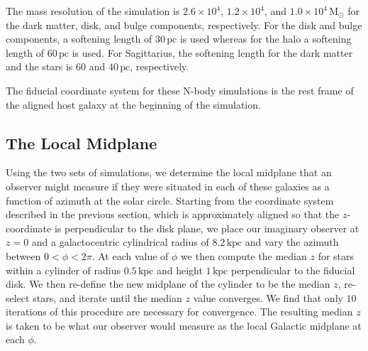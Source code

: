 \documentclass[twocolumn]{aastex62}
\newcommand{\Msun}{\ensuremath{\text{M}_\odot}}
\newcommand{\pc}{\text{pc}}
\newcommand{\kpc}{\text{kpc}}
\begin{document}
The mass resolution of the simulation is $2.6\times10^4$, $1.2\times10^4$, and
$1.0\times10^4\,\Msun$ for the dark matter, disk, and bulge components,
respectively. For the disk and bulge components, a softening length of
$30\,\pc$ is used whereas for the halo a softening length of $60\,\pc$ is
used. For Sagittarius, the softening length for the dark matter and the stars
is $60$ and $40\,\pc$, respectively.

The fiducial coordinate system for these N-body simulations is the rest frame
of the aligned host galaxy at the beginning of the simulation.

\subsection{The Local Midplane} \label{ssec:local_midplane}
Using the two sets of simulations, we determine the local midplane that an
observer might measure if they were situated in each of these galaxies as a
function of azimuth at the solar circle. Starting from the coordinate system
described in the previous section, which is approximately aligned so that the
$z$-coordinate is perpendicular to the disk plane, we place our imaginary
observer at $z=0$ and a galactocentric cylindrical radius of $8.2\,\kpc$ and
vary the azimuth between $0<\phi<2\pi$. At each value of $\phi$ we then
compute the median $z$ for stars within a cylinder of radius $0.5\,\kpc$ and
height $1\,\kpc$ perpendicular to the fiducial disk. We then re-define the new
midplane of the cylinder to be the median $z$, re-select stars, and iterate
until the median $z$ value converges. We find that only $10$ iterations of
this procedure are necessary for convergence. The resulting median $z$ is
taken to be what our observer would measure as the local Galactic midplane at
each $\phi$.
\end{document}
